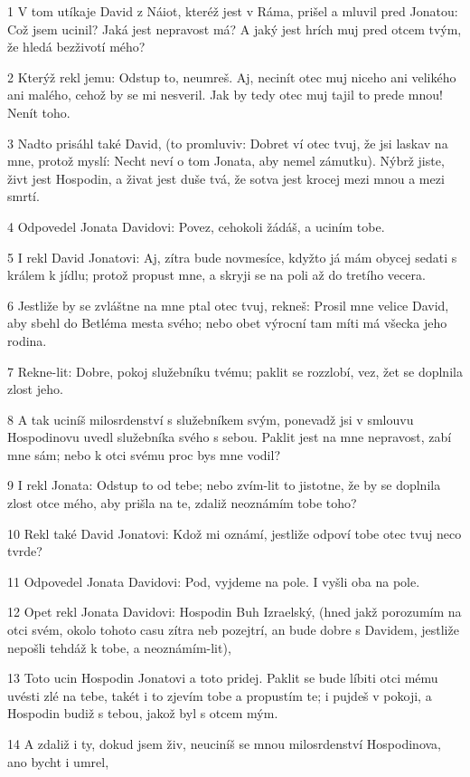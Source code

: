 \par 1 V tom utíkaje David z Náiot, kteréž jest v Ráma, prišel a mluvil pred Jonatou: Což jsem ucinil? Jaká jest nepravost má? A jaký jest hrích muj pred otcem tvým, že hledá bezživotí mého?
\par 2 Kterýž rekl jemu: Odstup to, neumreš. Aj, necinít otec muj niceho ani velikého ani malého, cehož by se mi nesveril. Jak by tedy otec muj tajil to prede mnou! Nenít toho.
\par 3 Nadto prisáhl také David, (to promluviv: Dobret ví otec tvuj, že jsi laskav na mne, protož myslí: Necht neví o tom Jonata, aby nemel zámutku). Nýbrž jiste, živt jest Hospodin, a živat jest duše tvá, že sotva jest krocej mezi mnou a mezi smrtí.
\par 4 Odpovedel Jonata Davidovi: Povez, cehokoli žádáš, a uciním tobe.
\par 5 I rekl David Jonatovi: Aj, zítra bude novmesíce, kdyžto já mám obycej sedati s králem k jídlu; protož propust mne, a skryji se na poli až do tretího vecera.
\par 6 Jestliže by se zvláštne na mne ptal otec tvuj, rekneš: Prosil mne velice David, aby sbehl do Betléma mesta svého; nebo obet výrocní tam míti má všecka jeho rodina.
\par 7 Rekne-lit: Dobre, pokoj služebníku tvému; paklit se rozzlobí, vez, žet se doplnila zlost jeho.
\par 8 A tak uciníš milosrdenství s služebníkem svým, ponevadž jsi v smlouvu Hospodinovu uvedl služebníka svého s sebou. Paklit jest na mne nepravost, zabí mne sám; nebo k otci svému proc bys mne vodil?
\par 9 I rekl Jonata: Odstup to od tebe; nebo zvím-lit to jistotne, že by se doplnila zlost otce mého, aby prišla na te, zdaliž neoznámím tobe toho?
\par 10 Rekl také David Jonatovi: Kdož mi oznámí, jestliže odpoví tobe otec tvuj neco tvrde?
\par 11 Odpovedel Jonata Davidovi: Pod, vyjdeme na pole. I vyšli oba na pole.
\par 12 Opet rekl Jonata Davidovi: Hospodin Buh Izraelský, (hned jakž porozumím na otci svém, okolo tohoto casu zítra neb pozejtrí, an bude dobre s Davidem, jestliže nepošli tehdáž k tobe, a neoznámím-lit),
\par 13 Toto ucin Hospodin Jonatovi a toto pridej. Paklit se bude líbiti otci mému uvésti zlé na tebe, takét i to zjevím tobe a propustím te; i pujdeš v pokoji, a Hospodin budiž s tebou, jakož byl s otcem mým.
\par 14 A zdaliž i ty, dokud jsem živ, neuciníš se mnou milosrdenství Hospodinova, ano bycht i umrel,
